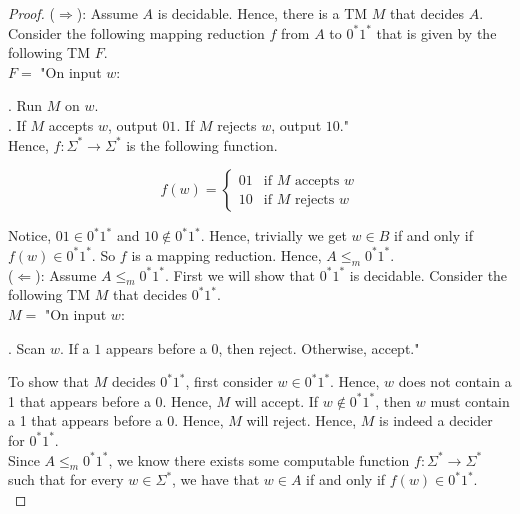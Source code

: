 \documentclass[12pt]{article}
\begin{document}
\begin{proof}
($\Rightarrow$): Assume $A$ is decidable. Hence, there is a TM $M$ that decides $A$. Consider the following mapping reduction $f$ from $A$ to $0^*1^*$ that is given by the following TM $F$. \\

$F = $ "On input $w$: \\

\setlength\parindent{15pt}

. Run $M$ on $w$.  \\
. If $M$ accepts $w$, output $01$. If $M$ rejects $w$, output $10$." \\

\setlength\parindent{0pt}
Hence, $f: \Sigma^* \rightarrow \Sigma^*$ is the following function. 

\[
  f(w) =
  \begin{cases}
        01 & \text{if $M$ accepts $w$} \\
        10 & \text{if $M$ rejects $w$} 
  \end{cases}
\]

Notice, $01 \in 0^*1^*$ and $10 \not \in 0^*1^*$. Hence, trivially we get $w \in B$ if and only if $f(w) \in 0^*1^*$. So $f$ is a mapping reduction. Hence, $A \leq_m 0^*1^*$. \\

($\Leftarrow$): Assume $A \leq_m 0^*1^*$. First we will show that $0^*1^*$ is decidable. Consider the following TM $M$ that decides $0^*1^*$. \\

$M = $ "On input $w$: \\

\setlength\parindent{15pt}

. Scan $w$. If a $1$ appears before a $0$, then reject. Otherwise, accept." \\

\setlength\parindent{0pt}

To show that $M$ decides $0^*1^*$, first consider $w \in 0^*1^*$. Hence, $w$ does not contain a 1 that appears before a 0. Hence, $M$ will accept. If $w \not \in 0^*1^*$, then $w$ must contain a 1 that appears before a 0. Hence, $M$ will reject. Hence, $M$ is indeed a decider for $0^*1^*$. \\

Since $A \leq_m 0^*1^*$, we know there exists some computable function $f: \Sigma^* \rightarrow \Sigma^*$ such that for every $w \in \Sigma^*$, we have that $w \in A$ if and only if $f(w) \in 0^*1^*$. \\


\end{proof}
\end{document}

